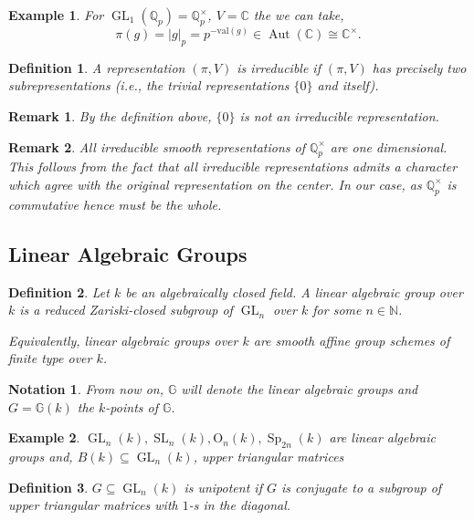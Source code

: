 \documentclass[10pt]{article}
\newtheorem{definition}{Definition}[section]
\newtheorem{notation}{Notation}[section]
\newtheorem{remark}{Remark}[section]
\newtheorem{example}{Example}[section]
\numberwithin{equation}{theorem}
\DeclareMathOperator{\Aut}{Aut}
\DeclareMathOperator{\GL}{GL}
\DeclareMathOperator{\SL}{SL}
\DeclareMathOperator{\Sp}{Sp}
\newcommand{\bN}[0]{\mathbb{N}}
\newcommand{\C}[0]{\mathbb{C}}
\newcommand{\bG}[0]{\mathbb{G}}
\newcommand{\bQ}[0]{\mathbb{Q}}
\newcommand{\ab}[1]{\vert #1\vert}
\begin{document}
\begin{example}
    For $\GL_1(\bQ_p) = \bQ^\times_p$, $V=\C$ the we can take,
    \begin{equation*}
        \pi(g) = \ab{g}_p = p^{-\mathrm{val}(g)}\in\Aut(\C)\cong \C^\times.
    \end{equation*}
\end{example}

\begin{definition}
    A representation $(\pi,V)$ is irreducible if $(\pi,V)$ has precisely two subrepresentations (i.e., the trivial representations $\{0\}$ and itself).
\end{definition}

\begin{remark}
    By the definition above, $\{0\}$ is not an irreducible representation.
\end{remark}

\begin{remark}
    All irreducible smooth representations of $\bQ^\times_p$ are one dimensional. This follows from the fact that all irreducible representations admits a character which agree with the original representation on the center. In our case, as $\bQ_p^\times$ is commutative hence must be the whole.
\end{remark}

\subsection{Linear Algebraic Groups}
\begin{definition}
    Let $k$ be an algebraically closed field. 
    A linear algebraic group over $k$ is a reduced Zariski-closed subgroup of $\GL_n$ over $k$ for some $n\in\bN$.
    \par Equivalently, linear algebraic groups over $k$ are smooth affine group schemes of finite type over $k$.
\end{definition}

\begin{notation}
From now on, $\bG$ will denote the linear algebraic groups and $G= \bG(k)$ the $k$-points of $\bG$.
\end{notation}

\begin{example}
    $\GL_n(k),\SL_n(k),\mathrm{O}_n(k),\Sp_{2n}(k)$ are linear algebraic groups and, $B(k)\subseteq\GL_n(k)$, upper triangular matrices
\end{example}

\begin{definition}
    $G\subseteq\GL_n(k)$ is unipotent if $G$ is conjugate to a subgroup of upper triangular matrices with $1$-s in the diagonal.
\end{definition}
\end{document}
